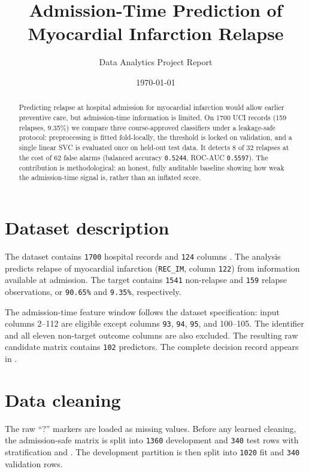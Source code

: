 \documentclass[11pt]{article}
\title{Admission-Time Prediction of Myocardial Infarction Relapse}
\author{Data Analytics Project Report}
\date{\today}
\begin{document}
\maketitle

\begin{abstract}
Predicting relapse at hospital admission for myocardial infarction would allow
earlier preventive care, but admission-time information is limited. On 1700 UCI
records (159 relapses, 9.35\%) we compare three course-approved classifiers
under a leakage-safe protocol: preprocessing is fitted fold-locally, the
threshold is locked on validation, and a single linear SVC is evaluated once on
held-out test data. It detects 8 of 32 relapses at the cost of 62 false alarms
(balanced accuracy \texttt{0.5244}, ROC-AUC \texttt{0.5597}). The contribution
is methodological: an honest, fully auditable baseline showing how weak the
admission-time signal is, rather than an inflated score.
\end{abstract}

\section{Dataset description}

The dataset contains \texttt{1700} hospital records and \texttt{124} columns
\cite{uci-dataset}. The analysis predicts relapse of myocardial infarction
(\texttt{REC\_IM}, column \texttt{122}) from information available at admission. The
target contains \texttt{1541} non-relapse and \texttt{159} relapse observations, or
\texttt{90.65\%} and \texttt{9.35\%}, respectively.

The admission-time feature window follows the dataset specification: input columns
2--112 are eligible except columns \texttt{93}, \texttt{94}, \texttt{95}, and
100--105. The identifier and all eleven non-target outcome columns are also
excluded. The resulting raw candidate matrix contains \texttt{102} predictors. The
complete decision record appears in
.

\section{Data cleaning}

The raw ``?'' markers are loaded as missing values. Before any learned cleaning,
the admission-safe matrix is split into \texttt{1360} development and \texttt{340} test
rows with stratification and . The development partition is then
split into \texttt{1020} fit and \texttt{340} validation rows.
\end{document}
